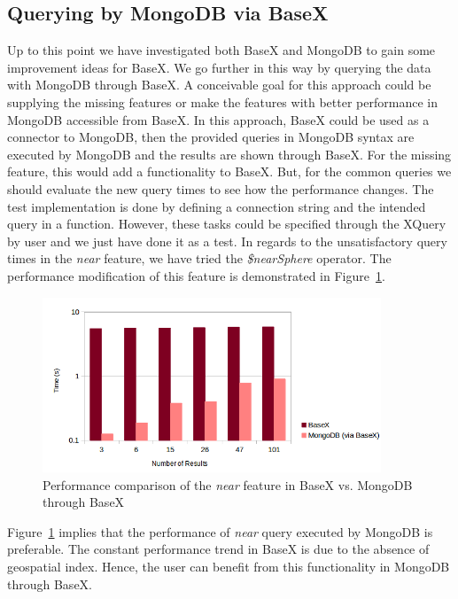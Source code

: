 \documentclass[a4paper,12pt]{article}
\begin{document}
\subsection{Querying by MongoDB via BaseX}
\label{MongoviaBX}
Up to this point we have investigated both BaseX and MongoDB to gain some improvement ideas for BaseX. We go further in this way by querying the data with MongoDB through BaseX. A conceivable goal for this approach could be supplying the missing features or make the features with better performance in MongoDB accessible from BaseX. In this approach, BaseX could be used as a connector to MongoDB, then the provided queries in MongoDB syntax are executed by MongoDB and the results are shown through BaseX. For the missing feature, this would add a functionality to BaseX. But, for the common queries we should evaluate the new query times to see how the performance changes. 
The test implementation is done by defining a connection string and the intended query in a function. However, these tasks could be specified through the XQuery by user and we just have done it as a test. 
In regards to the unsatisfactory query times in the \textit{near} feature, we have tried the \textit{\$nearSphere} operator. The performance modification of this feature is demonstrated in Figure~\ref{figMongoviaBX-near}.
 
\begin{figure}
\centering
\includegraphics[width=0.9\textwidth]{MongoviaBX-near-sec-log.png}
\caption{Performance comparison of the \textit{near} feature in BaseX vs. MongoDB through BaseX}
\label{figMongoviaBX-near}
\end{figure}

Figure~\ref{figMongoviaBX-near} implies that the performance of \textit{near} query executed by MongoDB is preferable. The constant performance trend in BaseX is due to the absence of geospatial index. Hence, the user can benefit from this functionality in MongoDB through BaseX. 
\end{document}
